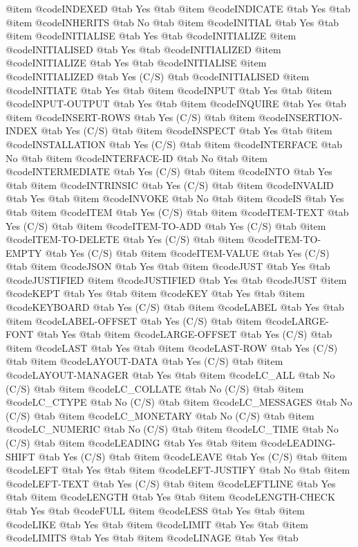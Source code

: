 @item @code{INDEXED} @tab Yes @tab
@item @code{INDICATE} @tab Yes @tab
@item @code{INHERITS} @tab No @tab
@item @code{INITIAL} @tab Yes @tab
@item @code{INITIALISE} @tab Yes @tab @code{INITIALIZE}
@item @code{INITIALISED} @tab Yes @tab @code{INITIALIZED}
@item @code{INITIALIZE} @tab Yes @tab @code{INITIALISE}
@item @code{INITIALIZED} @tab Yes	(C/S) @tab @code{INITIALISED}
@item @code{INITIATE} @tab Yes @tab
@item @code{INPUT} @tab Yes @tab
@item @code{INPUT-OUTPUT} @tab Yes @tab
@item @code{INQUIRE} @tab Yes @tab
@item @code{INSERT-ROWS} @tab Yes	(C/S) @tab
@item @code{INSERTION-INDEX} @tab Yes	(C/S) @tab
@item @code{INSPECT} @tab Yes @tab
@item @code{INSTALLATION} @tab Yes (C/S) @tab
@item @code{INTERFACE} @tab No @tab
@item @code{INTERFACE-ID} @tab No @tab
@item @code{INTERMEDIATE} @tab Yes	(C/S) @tab
@item @code{INTO} @tab Yes @tab
@item @code{INTRINSIC} @tab Yes	(C/S) @tab
@item @code{INVALID} @tab Yes @tab
@item @code{INVOKE} @tab No @tab
@item @code{IS} @tab Yes @tab
@item @code{ITEM} @tab Yes	(C/S) @tab
@item @code{ITEM-TEXT} @tab Yes	(C/S) @tab
@item @code{ITEM-TO-ADD} @tab Yes	(C/S) @tab
@item @code{ITEM-TO-DELETE} @tab Yes	(C/S) @tab
@item @code{ITEM-TO-EMPTY} @tab Yes	(C/S) @tab
@item @code{ITEM-VALUE} @tab Yes	(C/S) @tab
@item @code{JSON} @tab Yes @tab
@item @code{JUST} @tab Yes @tab @code{JUSTIFIED}
@item @code{JUSTIFIED} @tab Yes @tab @code{JUST}
@item @code{KEPT} @tab Yes @tab
@item @code{KEY} @tab Yes @tab
@item @code{KEYBOARD} @tab Yes	(C/S) @tab
@item @code{LABEL} @tab Yes @tab
@item @code{LABEL-OFFSET} @tab Yes	(C/S) @tab
@item @code{LARGE-FONT} @tab Yes @tab
@item @code{LARGE-OFFSET} @tab Yes	(C/S) @tab
@item @code{LAST} @tab Yes @tab
@item @code{LAST-ROW} @tab Yes	(C/S) @tab
@item @code{LAYOUT-DATA} @tab Yes	(C/S) @tab
@item @code{LAYOUT-MANAGER} @tab Yes @tab
@item @code{LC_ALL} @tab No	(C/S) @tab
@item @code{LC_COLLATE} @tab No	(C/S) @tab
@item @code{LC_CTYPE} @tab No	(C/S) @tab
@item @code{LC_MESSAGES} @tab No	(C/S) @tab
@item @code{LC_MONETARY} @tab No	(C/S) @tab
@item @code{LC_NUMERIC} @tab No	(C/S) @tab
@item @code{LC_TIME} @tab No	(C/S) @tab
@item @code{LEADING} @tab Yes @tab
@item @code{LEADING-SHIFT} @tab Yes	(C/S) @tab
@item @code{LEAVE} @tab Yes (C/S) @tab
@item @code{LEFT} @tab Yes @tab
@item @code{LEFT-JUSTIFY} @tab No @tab
@item @code{LEFT-TEXT} @tab Yes	(C/S) @tab
@item @code{LEFTLINE} @tab Yes @tab
@item @code{LENGTH} @tab Yes @tab
@item @code{LENGTH-CHECK} @tab Yes @tab @code{FULL}
@item @code{LESS} @tab Yes @tab
@item @code{LIKE} @tab Yes @tab
@item @code{LIMIT} @tab Yes @tab
@item @code{LIMITS} @tab Yes @tab
@item @code{LINAGE} @tab Yes @tab
